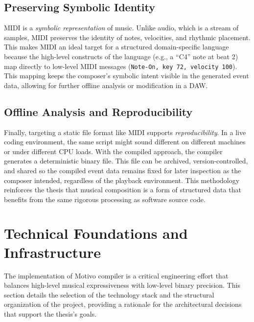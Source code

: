\subsection{Preserving Symbolic Identity}\label{detail-subsec:preserving-symbolic-identity}

MIDI is a \textit{symbolic representation} of music.
Unlike audio, which is a stream of samples, MIDI preserves the identity of notes, velocities, and rhythmic placement.
This makes MIDI an ideal target for a structured domain-specific language because the high-level constructs
of the language (e.g., a ``C4''
note at beat 2) map directly to low-level MIDI messages (\texttt{Note-On, key 72, velocity 100}).
This mapping keeps the composer's symbolic intent visible in the generated event data,
allowing for further offline analysis or modification in a DAW\@.

\subsection{Offline Analysis and Reproducibility}\label{detail-subsec:offline-analysis-and-reproducibility}

Finally, targeting a static file format like MIDI supports \textit{reproducibility}.
In a live coding environment, the same script might sound different on different machines or under different CPU loads.
With the compiled approach, the compiler generates a deterministic binary file.
This file can be archived, version-controlled, and shared so the compiled event data remains fixed for later inspection
as the composer intended, regardless of the playback environment.
This methodology reinforces the thesis that musical composition is a form of structured data that benefits from the same
rigorous processing as software source code.


\section{Technical Foundations and Infrastructure}\label{detail-sec:implementation-foundations}

The implementation of Motivo compiler is a critical engineering effort that balances high-level musical expressiveness
with low-level binary precision.
This section details the selection of the technology stack and the structural organization of the project, providing a
rationale for the architectural decisions that support the thesis's goals.

